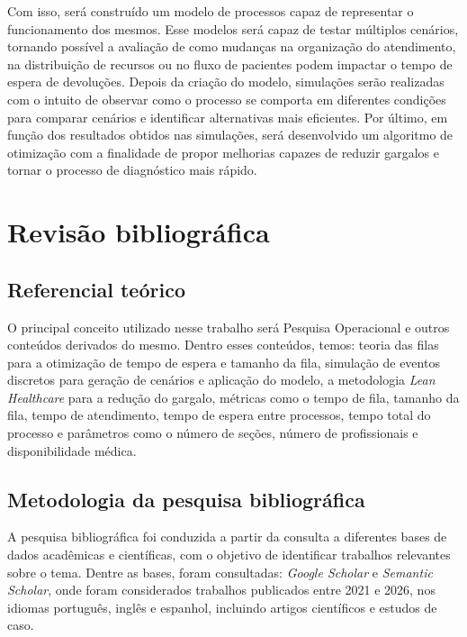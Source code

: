 \documentclass[
    12pt,                %
    openright,           %
    oneside,             %
    a4paper,             %
    english,             %
    brazil               %
]{abntex2}
\begin{document}
Com isso, será construído um modelo de processos capaz de representar o funcionamento dos mesmos. Esse modelos será capaz de testar múltiplos cenários, tornando possível a avaliação de como mudanças na organização do atendimento, na distribuição de recursos ou no fluxo de pacientes podem impactar o tempo de espera de devoluções. Depois da criação do modelo, simulações serão realizadas com o intuito de observar como o processo se comporta em diferentes condições para comparar cenários e identificar alternativas mais eficientes. Por último, em função dos resultados obtidos nas simulações, será desenvolvido um algoritmo de otimização com a finalidade de propor melhorias capazes de reduzir gargalos e tornar o processo de diagnóstico mais rápido.
 

\chapter{Revisão bibliográfica}

\section{Referencial teórico}
\label{sec:referencial}
O principal conceito utilizado nesse trabalho será Pesquisa Operacional e outros conteúdos derivados do mesmo. Dentro esses conteúdos, temos:  teoria das filas para a otimização de tempo de espera e tamanho da fila, simulação de eventos discretos para geração de cenários e aplicação do modelo, a metodologia \textit{Lean Healthcare} para a redução do gargalo, métricas como o tempo de fila, tamanho da fila, tempo de atendimento, tempo de espera entre processos, tempo total do processo e parâmetros como o número de seções, número de profissionais e disponibilidade médica.


\section{Metodologia da pesquisa bibliográfica}

A pesquisa bibliográfica foi conduzida a partir da consulta a diferentes bases de dados acadêmicas e científicas, com o objetivo de identificar trabalhos relevantes sobre o tema. Dentre as bases, foram consultadas: \textit{Google Scholar} e \textit{Semantic Scholar}, onde foram considerados trabalhos publicados entre 2021 e 2026, nos idiomas português, inglês e espanhol, incluindo artigos científicos e estudos de caso.
\end{document}

